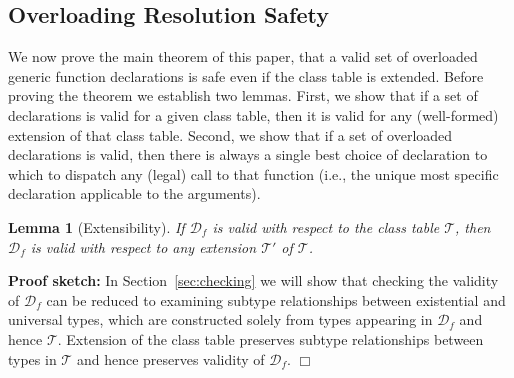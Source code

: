 \documentclass[10pt]{sigplanconf}
\newcommand{\TODO}[1]{\textbf{\emph{\textcolor{red}{TODO}}}: \textsf{\footnotesize #1}}
\newcommand{\T}{\ensuremath{\mathcal{T}}}
\newcommand{\D}{\ensuremath{\mathcal{D}}}
\newcommand{\Df}[1][f]{\D_{\!#1}}
\newtheorem{lemma}{Lemma}
\newenvironment{psketch}{\noindent \textbf{Proof sketch:} }{\hfill $\Box$}
\begin{document}
\subsection{Overloading Resolution Safety}\label{sec:safety}

We now prove the main theorem of this paper, 
that a valid set of overloaded generic function declarations 
is safe 
even if the class table is extended.
Before proving the theorem we establish two lemmas. 
First, we show that if a set of declarations is valid for a given class table, 
then it is valid for any (well-formed) extension of that class table.
Second, we show that if a set of overloaded declarations is valid, 
then there is always a single best choice of declaration 
to which to dispatch any (legal) call to that function 
(i.e., the unique most specific declaration applicable to the arguments).


\begin{lemma}[Extensibility]
\label{lem:mod}
If $\Df$ is valid with respect to the class table $\T$,
then $\Df$ is valid with respect to any extension $\T'$ of $\T$.
\end{lemma}
\begin{psketch}
In Section~\ref{sec:checking} we will show that checking the validity of
$\Df$ can be reduced to examining subtype relationships
between existential and universal types, which are constructed solely from
types
appearing in $\Df$ and hence $\T$. Extension of the class table
preserves subtype relationships between types in $\T$ and hence preserves
validity of $\Df$.
\end{psketch}
\end{document}
